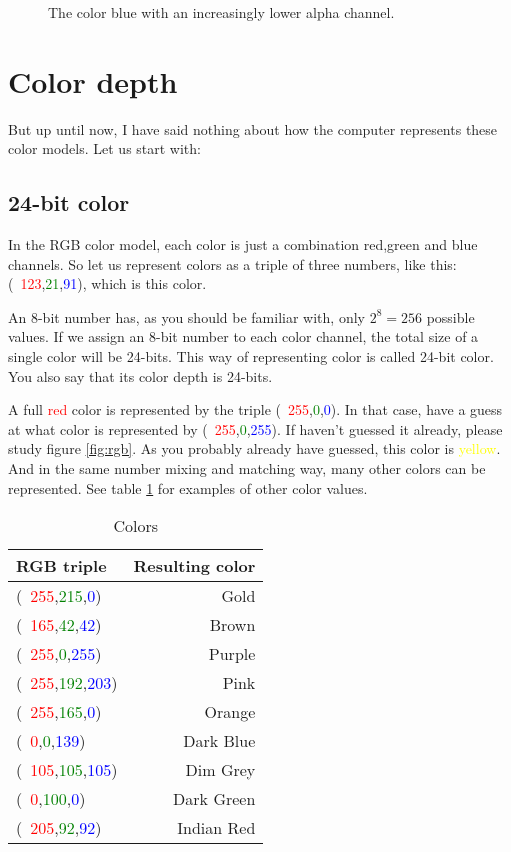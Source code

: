 \begin{refsection}
  \begin{figure}[h!]
    \centering
    \caption{The color blue with an increasingly lower alpha channel.}
    \label{fig:alpha}
  \end{figure}

  \section{Color depth}
  \label{sec:color-depth}

  \newcommand{\rgbtrip}[3]{\mbox{( \textcolor{red}{#1},\textcolor{green}{#2},\textcolor{blue}{#3})}}

  But up until now, I have said nothing about how the computer
  represents these color models. Let us start with:

  \subsection{24-bit color}
  \label{sec:24-bit-color}

  In the RGB color model, each color is just a combination red,green
  and blue channels. So let us represent colors as a triple of three
  numbers, like this: \rgbtrip{123}{21}{91}, which is
  \textcolor[RGB]{123,21,91}{this color}.

  An 8-bit number has, as you should be familiar with, only $2^8 =
  256$ possible values. If we assign an 8-bit number to each color
  channel, the total size of a single color will be 24-bits. This way
  of representing color is called 24-bit color. You also say that its color depth is 24-bits.

  \newcommand{\selfcolor}[1]{\textcolor{#1}{#1}}

  A full \selfcolor{red} color is represented by the triple \rgbtrip{255}{0}{0}. In
  that case, have a guess at what color is represented by
  \rgbtrip{255}{0}{255}. If haven't guessed it already, please study
  figure \ref{fig:rgb}. As you probably already have guessed, this color
  is \selfcolor{yellow}. And in the same number mixing and matching way, many other
  colors can be represented. See table \ref{tab:color-examples} for
  examples of other color values.

  \begin{table}[h!]
    \newcommand{\colorrow}[4]{  \rgbtrip{#1}{#2}{#3} &
      \textcolor[RGB]{#1,#2,#3}{#4} \\}
    \centering
    \begin{tabular}[h!]{lr}
      \toprule
      RGB triple & Resulting color \\
      \midrule
      \colorrow{255}{215}{0}{Gold}
      \colorrow{165}{42}{42}{Brown}
      \colorrow{255}{0}{255}{Purple}
      \colorrow{255}{192}{203}{Pink}
      \colorrow{255}{165}{0}{Orange}
      \colorrow{0}{0}{139}{Dark Blue}
      \colorrow{105}{105}{105}{Dim Grey}
      \colorrow{0}{100}{0}{Dark Green}
      \colorrow{205}{92}{92}{Indian Red}
      \bottomrule
    \end{tabular}
    \caption{Colors}
    \label{tab:color-examples}
  \end{table}


\end{refsection}
